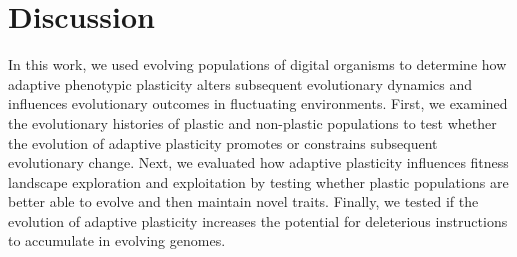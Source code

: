 






\section{Discussion}

In this work, we used evolving populations of digital organisms to determine how adaptive phenotypic plasticity alters subsequent evolutionary dynamics and influences evolutionary outcomes in fluctuating environments.
First, we examined the evolutionary histories of plastic and non-plastic populations to test whether the evolution of adaptive plasticity promotes or constrains subsequent evolutionary change.
Next, we evaluated how adaptive plasticity influences fitness landscape exploration and exploitation by testing whether plastic populations are better able to evolve and then maintain novel traits.
Finally, we tested if the evolution of adaptive plasticity increases the potential for deleterious instructions to accumulate in evolving genomes.


